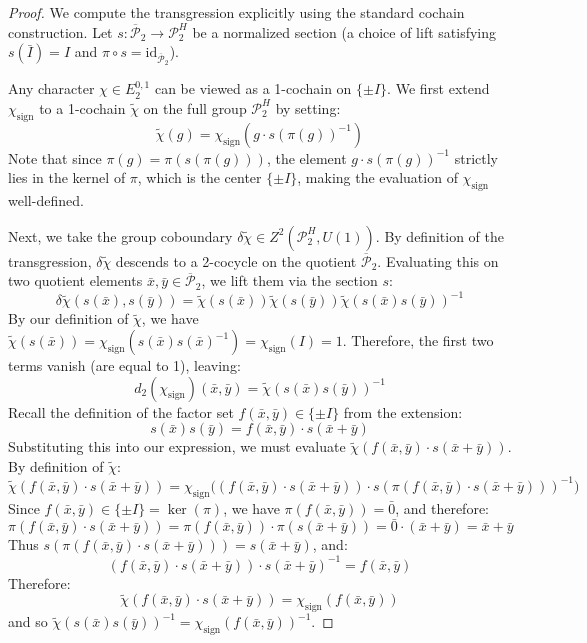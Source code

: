 \documentclass[11pt]{article}
\begin{document}
\begin{proof}
We compute the transgression explicitly using the standard cochain construction. Let $s: \overline{\mathcal{P}}_2 \rightarrow \mathcal{P}_2^H$ be a normalized section (a choice of lift satisfying $s(\bar{I}) = I$ and $\pi \circ s = \mathrm{id}_{\overline{\mathcal{P}}_2}$).

Any character $\chi \in E_2^{0,1}$ can be viewed as a 1-cochain on $\{\pm I\}$. We first extend $\chi_{\text{sign}}$ to a 1-cochain $\tilde{\chi}$ on the full group $\mathcal{P}_2^H$ by setting:
\[
    \tilde{\chi}(g) = \chi_{\text{sign}}(g \cdot s(\pi(g))^{-1})
\]
Note that since $\pi(g) = \pi(s(\pi(g)))$, the element $g \cdot s(\pi(g))^{-1}$ strictly lies in the kernel of $\pi$, which is the center $\{\pm I\}$, making the evaluation of $\chi_{\text{sign}}$ well-defined.

Next, we take the group coboundary $\delta \tilde{\chi} \in Z^2(\mathcal{P}_2^H, U(1))$. By definition of the transgression, $\delta \tilde{\chi}$ descends to a 2-cocycle on the quotient $\overline{\mathcal{P}}_2$. Evaluating this on two quotient elements $\bar{x}, \bar{y} \in \overline{\mathcal{P}}_2$, we lift them via the section $s$:
\[
    \delta \tilde{\chi}(s(\bar{x}), s(\bar{y})) = \tilde{\chi}(s(\bar{x})) \tilde{\chi}(s(\bar{y})) \tilde{\chi}(s(\bar{x})s(\bar{y}))^{-1}
\]
By our definition of $\tilde{\chi}$, we have $\tilde{\chi}(s(\bar{x})) = \chi_{\text{sign}}(s(\bar{x})s(\bar{x})^{-1}) = \chi_{\text{sign}}(I) = 1$. Therefore, the first two terms vanish (are equal to 1), leaving:
\[
    d_2(\chi_{\text{sign}})(\bar{x}, \bar{y}) = \tilde{\chi}(s(\bar{x})s(\bar{y}))^{-1}
\]
Recall the definition of the factor set $f(\bar{x}, \bar{y}) \in \{\pm I\}$ from the extension:
\[
    s(\bar{x})s(\bar{y}) = f(\bar{x}, \bar{y}) \cdot s(\bar{x}+\bar{y})
\]
Substituting this into our expression, we must evaluate $\tilde{\chi}(f(\bar{x}, \bar{y}) \cdot s(\bar{x}+\bar{y}))$. By definition of $\tilde{\chi}$:
\[
    \tilde{\chi}(f(\bar{x}, \bar{y}) \cdot s(\bar{x}+\bar{y})) = \chi_{\text{sign}}\bigl((f(\bar{x}, \bar{y}) \cdot s(\bar{x}+\bar{y})) \cdot s(\pi(f(\bar{x}, \bar{y}) \cdot s(\bar{x}+\bar{y})))^{-1}\bigr)
\]
Since $f(\bar{x}, \bar{y}) \in \{\pm I\} = \ker(\pi)$, we have $\pi(f(\bar{x}, \bar{y})) = \bar{0}$, and therefore:
\[
    \pi(f(\bar{x}, \bar{y}) \cdot s(\bar{x}+\bar{y})) = \pi(f(\bar{x}, \bar{y})) \cdot \pi(s(\bar{x}+\bar{y})) = \bar{0} \cdot (\bar{x}+\bar{y}) = \bar{x}+\bar{y}
\]
Thus $s(\pi(f(\bar{x}, \bar{y}) \cdot s(\bar{x}+\bar{y}))) = s(\bar{x}+\bar{y})$, and:
\[
    (f(\bar{x}, \bar{y}) \cdot s(\bar{x}+\bar{y})) \cdot s(\bar{x}+\bar{y})^{-1} = f(\bar{x}, \bar{y})
\]
Therefore:
\[
    \tilde{\chi}(f(\bar{x}, \bar{y}) \cdot s(\bar{x}+\bar{y})) = \chi_{\text{sign}}(f(\bar{x}, \bar{y}))
\]
and so $\tilde{\chi}(s(\bar{x})s(\bar{y}))^{-1} = \chi_{\text{sign}}(f(\bar{x}, \bar{y}))^{-1}$.


\end{proof}
\end{document}

